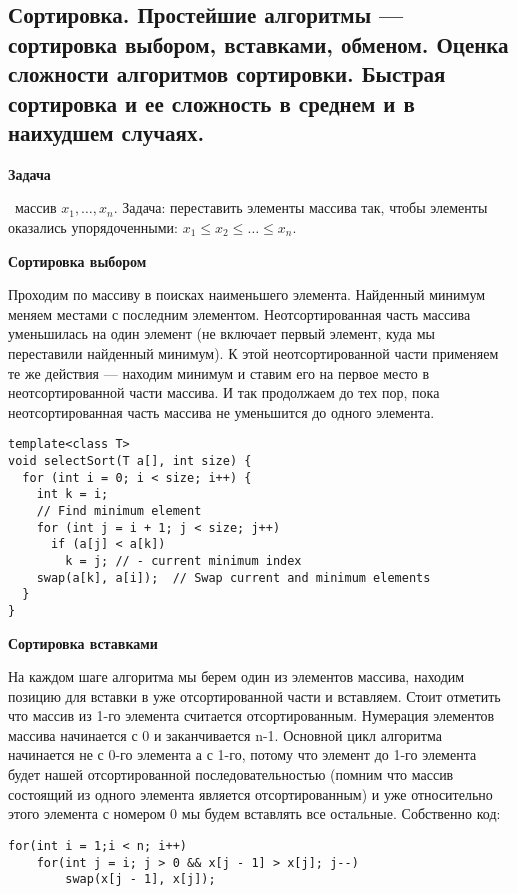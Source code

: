 \subsection{Сортировка.  Простейшие  алгоритмы --- сортировка  выбором,  вставками,  обменом.  Оценка  сложности алгоритмов сортировки. Быстрая сортировка и ее сложность в среднем и в наихудшем случаях.}

\textbf{Задача}

\faEye \ массив $x_1, \dots, x_n$.
Задача: переставить элементы массива так, чтобы элементы оказались упорядоченными: $x_1 \leqslant x_2 \leqslant \dots \leqslant x_n$.

\textbf{Сортировка выбором}

Проходим по массиву в поисках наименьшего элемента. Найденный минимум меняем местами с последним элементом. Неотсортированная часть массива уменьшилась на один элемент (не включает первый элемент, куда мы переставили найденный минимум). К этой неотсортированной части применяем те же действия — находим минимум и ставим его на первое место в неотсортированной части массива. И так продолжаем до тех пор, пока неотсортированная часть массива не уменьшится до одного элемента.

\begin{verbatim}
template<class T> 
void selectSort(T a[], int size) {
  for (int i = 0; i < size; i++) {
    int k = i;
    // Find minimum element
    for (int j = i + 1; j < size; j++)
      if (a[j] < a[k])
        k = j; // - current minimum index
    swap(a[k], a[i]);  // Swap current and minimum elements
  }
}
\end{verbatim}

\textbf{Сортировка вставками}

На каждом шаге алгоритма мы берем один из элементов массива, находим позицию для вставки в уже отсортированной части и вставляем. Стоит отметить что массив из 1-го элемента считается отсортированным.
Нумерация элементов массива начинается с 0 и заканчивается n-1.
Основной цикл алгоритма начинается не с 0-го элемента а с 1-го, потому что элемент до 1-го элемента будет нашей отсортированной последовательностью (помним что массив состоящий из одного элемента является отсортированным) и уже относительно этого элемента с номером 0 мы будем вставлять все остальные. Собственно код:

\begin{verbatim}
for(int i = 1;i < n; i++)         
    for(int j = i; j > 0 && x[j - 1] > x[j]; j--) 
	    swap(x[j - 1], x[j]);
\end{verbatim}

